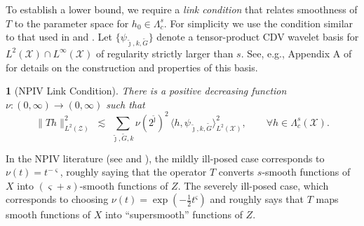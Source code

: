 \documentclass[12pt,american]{article}
\theoremstyle{definition}
\theoremstyle{plain}
\newtheorem{assumption}{\protect\assumptionname}
\theoremstyle{definition}
\theoremstyle{plain}
\theoremstyle{plain}
\theoremstyle{plain}
\theoremstyle{plain}
\theoremstyle{plain}
\providecommand{\assumptionname}{Assumption}
\providecommand{\assumptionname}{Assumption}
\begin{document}
To establish a lower bound, we require a \emph{link condition} that relates smoothness of $T$ to the parameter space for $h_0 \in \Lambda^s_c$. For simplicity we use the condition similar to that used in \cite{chen2011rate} and \cite{chen2018optimal}. Let $\{\psi_{\tilde{\jmath},k,\tilde{G}}\}$ denote a tensor-product CDV wavelet basis for  $L^2(\mathcal{X})\cap L^{\infty}(\mathcal{X})$ of regularity strictly larger than $s$. See, e.g., Appendix A of \cite{chen2018optimal} for details on the construction and properties of this basis.

\begin{assumption}[NPIV Link Condition]
  \label{ass:link}
  There is a positive decreasing function $\nu:(0, \infty)\to(0, \infty)$ such that
  \begin{equation}
    \label{eq:link-condition}
    \|T h\|_{L^2(\mathcal{Z})}^2
    \;\lesssim\;
    \sum_{\tilde{\jmath},\tilde{G},k}
    \nu(2^{\tilde{\jmath}})^2\,
    \bigl\langle h, \psi_{\tilde{\jmath},k,\tilde{G}}\bigr\rangle_{L^2(\mathcal{X})}^2,
    \qquad
    \forall h \in  \Lambda_c^s(\mathcal{X}).
  \end{equation}
\end{assumption}

In the NPIV literature (see \cite{HallHorowitz} and \cite{chen2011rate}), the mildly ill-posed case corresponds to $\nu(t) = t^{-\varsigma}$, roughly saying that the  operator $T$ converts $s$-smooth functions of $X$ into $(\varsigma+s)$-smooth functions of $Z$. The severely ill-posed case, which corresponds to choosing $\nu(t) = \exp(-\frac{1}{2}t^{\varsigma})$ and roughly says that $T$ maps smooth functions of $X$ into ``supersmooth'' functions of $Z$.
\end{document}
